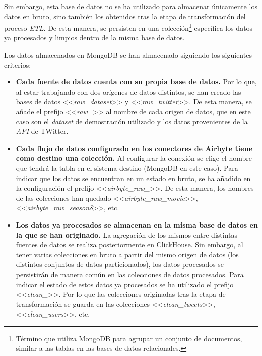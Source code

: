 Sin embargo, esta base de datos no se ha utilizado para almacenar únicamente los datos en bruto, sino también los obtenidos tras la etapa de transformación del proceso \textit{ETL}. De esta manera, se persisten en una colección\footnote{Término que utiliza MongoDB para agrupar un conjunto de documentos, similar a las tablas en las bases de datos relacionales.} específica los datos ya procesados y limpios dentro de la misma base de datos.

Los datos almacenados en MongoDB se han almacenado siguiendo los siguientes criterios:

\begin{itemize}
    \item \textbf{Cada fuente de datos cuenta con su propia base de datos.} Por lo que, al estar trabajando con dos orígenes de datos distintos, se han creado las bases de datos <<\textit{raw\_dataset}>> y <<\textit{raw\_twitter}>>. De esta manera, se añade el prefijo <<\textit{raw\_}>> al nombre de cada origen de datos, que en este caso son el \textit{dataset} de demostración utilizado y los datos provenientes de la \textit{API} de TWitter.

    \item \textbf{Cada flujo de datos configurado en los conectores de Airbyte tiene como destino una colección.} Al configurar la conexión se elige el nombre que tendrá la tabla en el sistema destino (MongoDB en este caso). Para indicar que los datos se encuentran en un estado en bruto, se ha añadido en la configuración el prefijo <<\textit{airbyte\_raw\_}>>. De esta manera, los nombres de las colecciones han quedado <<\textit{airbyte\_raw\_movie}>>, <<\textit{airbyte\_raw\_season8}>>, etc.

    \item \textbf{Los datos ya procesados se almacenan en la misma base de datos en la que se han originado.} La agregación de los mismos entre distintas fuentes de datos se realiza posteriormente en ClickHouse. Sin embargo, al tener varias colecciones en bruto a partir del mismo origen de datos (los distintos conjuntos de datos particionados), los datos procesados se persistirán de manera común en las colecciones de datos procesados. Para indicar el estado de estos datos ya procesados se ha utilizado el prefijo <<\textit{clean\_}>>. Por lo que las colecciones originadas tras la etapa de transformación se guarda en las colecciones <<\textit{clean\_tweets}>>, <<\textit{clean\_users}>>, etc.
\end{itemize}

